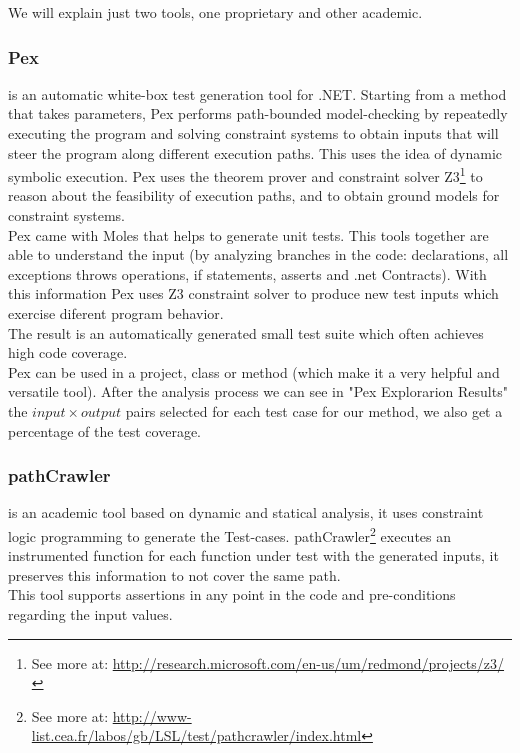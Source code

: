 \documentclass[10pt, conference, compsocconf]{IEEEtran}
\begin{document}
We will explain just two tools, one proprietary and other academic.

\subsubsection{\textbf{Pex}\cite{Tillmann:2008:PWB:1792786.1792798}} is an automatic white-box test generation tool for .NET. Starting from a
method that takes parameters, Pex performs path-bounded model-checking
by repeatedly executing the program and solving constraint systems to obtain inputs that will steer the program along different execution paths.
This uses the idea of dynamic symbolic execution\cite{Tillmann06unittests}. Pex uses the theorem prover and
constraint solver Z3\footnote{See more at: \url{http://research.microsoft.com/en-us/um/redmond/projects/z3/}} to reason about the feasibility of execution paths, and
to obtain ground models for constraint systems.\\
Pex came with Moles that helps to generate unit tests. This tools together are able to understand the input (by analyzing branches in the code:
declarations, all exceptions throws operations, if statements, asserts and .net Contracts). With this information Pex uses Z3 constraint solver to
produce new test inputs which exercise diferent program behavior.\\
The result is an automatically generated small test suite which often achieves high code coverage.\\
Pex can be used in a project, class or method (which make it a very helpful and versatile tool). After the analysis process we can see in "Pex Explorarion Results"
the $input \times output$ pairs selected for each test case for our method, we also get a percentage of the test coverage.

\subsubsection{\textbf{pathCrawler}\cite{Williams05pathcrawler:automatic}} is an academic tool based on dynamic and statical analysis, 
it uses constraint logic programming to generate the Test-cases. pathCrawler\footnote{See more at: \url{http://www-list.cea.fr/labos/gb/LSL/test/pathcrawler/index.html}} executes an instrumented function for each function under test
with the generated inputs, it preserves this information to not cover the same path.\\
This tool supports assertions in any point in the code and pre-conditions regarding the input values.
\end{document}
